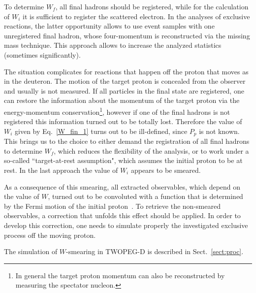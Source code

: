 
To determine $W_{f}$, all final hadrons should be registered, while for the calculation of $W_{i}$ it is sufficient to register the scattered electron. 
In the analyses of exclusive reactions, the latter opportunity allows  to use event samples with one unregistered final hadron, whose four-momentum is reconstructed via the missing mass technique. This approach allows to increase the analyzed statistics (sometimes significantly).


The situation complicates for reactions that happen off the proton that moves as in the deuteron. The motion of the target proton is concealed from the observer and usually is not measured. If all particles in the final state are registered, one can restore the information about the momentum of the target proton via the energy-momentum conservation\footnote[3]{In general the target proton momentum can also be reconstructed by measuring the spectator nucleon.}, however if one of the final hadrons is not registered this information turned out to be totally lost. Therefore the value of $W_{i}$ given by Eq.~\eqref{W_fin_1} turns out to be ill-defined, since $P_{p}$ is not known. This brings us to the choice to either demand the registration of all final hadrons to determine $W_{f}$, which reduces the flexibility of the analysis, or to work under a so-called ``target-at-rest assumption", which assumes the initial proton to be at rest. In the last approach the value of $W_{i}$ appears to be smeared.

As a consequence of this smearing, all extracted observables, which depend on the value of $W$, turned out to be convoluted with a function that is determined by the Fermi motion of the initial proton~\cite{Skorodumina:2015rea}. To retrieve the non-smeared observables, a correction that unfolds this effect should be applied. In order to develop this correction, one needs to simulate properly the investigated exclusive process off the moving proton. 

The simulation of $W$-smearing in TWOPEG-D is described in Sect.~\ref{sect:proc}.

